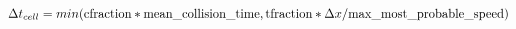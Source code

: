 \documentclass[12pt]{article}
\begin{document}
$$ 
  \Delta t_{cell} = min(\textnormal{cfraction} * \textnormal{mean\_collision\_time}, \textnormal{tfraction} * \Delta x / \textnormal{max\_most\_probable\_speed})
$$
\end{document}
